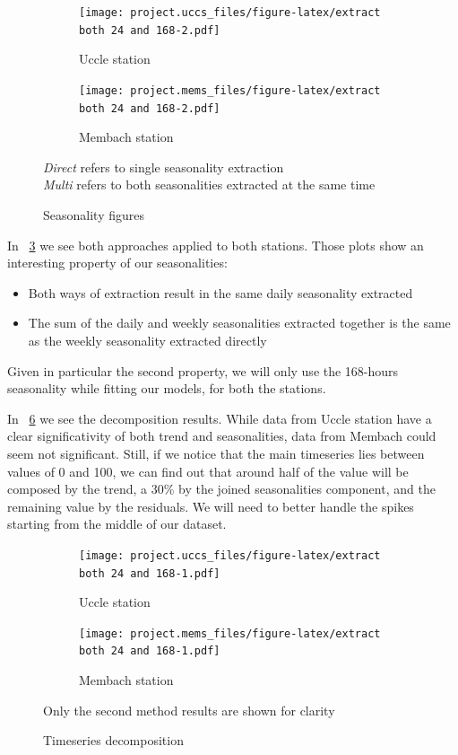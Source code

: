 \documentclass[12pt]{article}
\begin{document}
\begin{figure}[h]
	\begin{subfigure}{.5\linewidth}
		\texttt{[image: project.uccs\_files/figure-latex/extract both 24 and 168-2.pdf]}
		\caption{Uccle station}
		\label{fig:direct-multi-seasonality:uccs}
	\end{subfigure}
	\begin{subfigure}{.5\linewidth}
		\texttt{[image: project.mems\_files/figure-latex/extract both 24 and 168-2.pdf]}
		\caption{Membach station}
		\label{fig:direct-multi-seasonality:mems}
	\end{subfigure}
	\begin{center}
		\caption{Seasonality figures}{\small\textit{Direct} refers to single seasonality extraction\\\textit{Multi} refers to both seasonalities extracted at the same time}
		\label{fig:direct-multi-seasonality}
	\end{center}
\end{figure}

In \figurename~\ref{fig:direct-multi-seasonality} we see both approaches applied to both stations. Those plots show an interesting property of our seasonalities:
\begin{itemize}[topsep=0.5em,itemsep=0em,partopsep=0.5em]
	\item Both ways of extraction result in the same daily seasonality extracted
	\item The sum of the daily and weekly seasonalities extracted together is the same as the weekly seasonality extracted directly
\end{itemize}
Given in particular the second property, we will only use the 168-hours seasonality while fitting our models, for both the stations.

In \figurename~\ref{fig:decomposed} we see the decomposition results. While data from Uccle station have a clear significativity of both trend and seasonalities, data from Membach could seem not significant. Still, if we notice that the main timeseries lies between values of 0 and 100, we can find out that around half of the value will be composed by the trend, a 30\% by the joined seasonalities component, and the remaining value by the residuals. We will need to better handle the spikes starting from the middle of our dataset.

\begin{figure}[h]
	\begin{subfigure}{.5\linewidth}
		\texttt{[image: project.uccs\_files/figure-latex/extract both 24 and 168-1.pdf]}
		\caption{Uccle station}
		\label{fig:decomposed:uccs}
	\end{subfigure}
	\begin{subfigure}{.5\linewidth}
		\texttt{[image: project.mems\_files/figure-latex/extract both 24 and 168-1.pdf]}
		\caption{Membach station}
		\label{fig:decomposed:mems}
	\end{subfigure}
	\begin{center}
		\caption{Timeseries decomposition}{\small Only the second method results are shown for clarity}
		\label{fig:decomposed}
	\end{center}
\end{figure}
\end{document}

